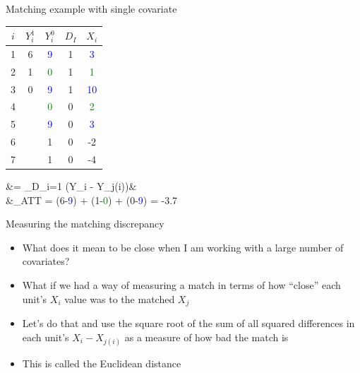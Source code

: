 \documentclass{beamer}
\begin{document}
	
\begin{frame}{Matching example with single covariate}
	
	\begin{table}
	\begin{tabular}{c|c|c|c|c}
	\hline
	$i$ & $Y^1_i$ & $Y^0_i$ & $D_I$ & $X_i$ \\
	\hline
	1 & 6 &  \textcolor{blue}{9} & 1 & \textcolor{blue}{3} \\
	2 & 1 &  \textcolor{green}{0} & 1 & \textcolor{green}{1} \\
	3 & 0 &   \textcolor{blue}{9} & 1 & \textcolor{blue}{10} \\
	\hline
	4 &  & \textcolor{green}{0} & 0 & \textcolor{green}{2} \\
	5 &  & \textcolor{blue}{9} & 0 & \textcolor{blue}{3} \\
	6 &  & 1 & 0 & -2 \\
	7 &  & 1 & 0 & -4 \\
	\hline
	\end{tabular}
	\end{table}
	
	
	\begin{flalign*}
		&= \sum_{D_i=1} (Y_i - Y_{j(i)})& \\
		&\widehat{\delta}_{ATT} =  \cdot (6-\textcolor{blue}{9}) +  \cdot (1-\textcolor{green}{0}) +  \cdot (0-\textcolor{blue}{9}) = -3.7
	\end{flalign*}

\end{frame}


%



\begin{frame}{Measuring the matching discrepancy}

\begin{itemize}
\item What does it mean to be close when I am working with a large number of covariates?
\item What if we had a way of measuring a match in terms of how ``close'' each unit's $X_i$ value was to the matched $X_j$
\item Let's do that and use the square root of the sum of all squared differences in each unit's $X_i - X_{j(i)}$ as a measure of how bad the match is
\item This is called the Euclidean distance
\end{itemize}


\end{frame}
\end{document}
